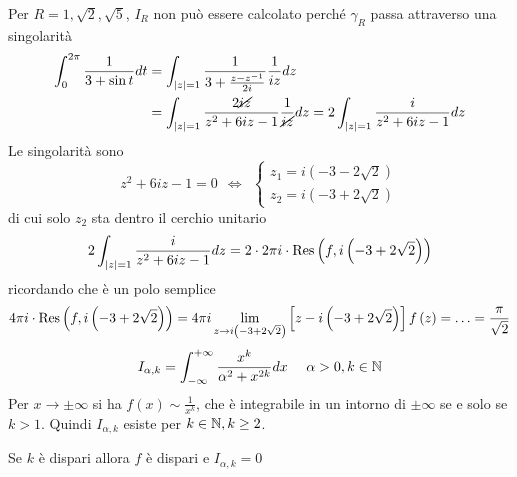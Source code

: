 Per $R = 1,\sqrt{2} ,\sqrt{5}$, $I_{R}$ non può essere calcolato perché $\gamma _{R}$ passa attraverso una singolarità
\Soluzione
\begin{align*}
\int ^{2\pi }_{0}\frac{1}{3 + \sin t} dt & = \int _{\left| z\right| = 1}\frac{1}{3 + \frac{z - z^{ - 1}}{2i}}\frac{1}{iz} dz\\
 & = \int _{\left| z\right| = 1}\frac{2\cancel{iz}}{z^{2} + 6iz - 1}\frac{1}{\cancel{iz}} dz = 2\int _{\left| z\right| = 1}\frac{i}{z^{2} + 6iz - 1} dz
\end{align*}
Le singolarità sono
\begin{equation*}
z^{2} + 6iz - 1 = 0\ \ \iff \ \ 
\begin{cases}
z_{1} = i\left(- 3 - 2\sqrt{2}\right)\\
z_{2} = i\left(- 3 + 2\sqrt{2}\right)
\end{cases}
\end{equation*}
di cui solo $z_{2}$ sta dentro il cerchio unitario
\begin{equation*}
2\int _{\left| z\right| = 1}\frac{i}{z^{2} + 6iz - 1} dz = 2\cdot 2\pi i\cdot \operatorname{Res} \left(f,i\left(- 3 + 2\sqrt{2}\right)\right)
\end{equation*}
ricordando che è un polo semplice
\begin{equation*}
4\pi i\cdot \operatorname{Res} \left(f,i\left(- 3 + 2\sqrt{2}\right)\right) = 4\pi i\lim\limits _{z\rightarrow i\left(- 3 + 2\sqrt{2}\right)}\left[ z - i\left(- 3 + 2\sqrt{2}\right)\right] f\left(z\right) = \dotsc = \frac{\pi }{\sqrt{2}}
\end{equation*}
\Soluzione
\begin{equation*}
I_{\alpha ,k} = \int ^{ + \infty }_{ - \infty }\frac{x^{k}}{\alpha ^{2} + x^{2k}} dx\ \ \ \ \alpha  > 0,k\in \NN 
\end{equation*}
Per $x\rightarrow \pm \infty $ si ha $f\left(x\right) \sim \frac{1}{x^{k}}$, che è integrabile in un intorno di $\pm \infty $ se e solo se $k > 1$. Quindi $I_{\alpha ,k}$ esiste per $k\in \mathbb{N}  ,k\geq 2$.

Se $k$ è dispari allora $f$ è dispari e $I_{\alpha ,k} = 0$

